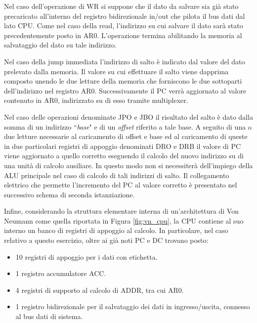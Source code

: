 Nel caso dell'operazione di WR si suppone che il dato da salvare sia già stato precaricato all'interno del registro bidirezionale in/out che pilota il bus dati dal lato CPU. Come nel caso della read, l'indirizzo su cui salvare il dato sarà stato precedentemente posto in AR0. L'operazione termina abilitando la memoria al salvataggio del dato su tale indirizzo.
\par \bigskip \noindent
Nel caso della jump immediata l'indirizzo di salto è indicato dal valore del dato prelevato dalla memoria. Il valore su cui effettuare il salto viene dapprima composto unendo le due letture della memoria che forniscono le due sottoparti dell'indirizzo nel registro AR0. Successivamente il PC verrà aggiornato al valore contenuto in AR0, indirizzato su di esso tramite multiplexer.
\par \bigskip \noindent
Nel caso delle operazioni denominate JPO e JBO il risultato del salto è dato dalla somma di un indirizzo \textquotedblleft \textit{base}" e di un \textit{offset} riferito a tale base. A seguito di una o due letture necessarie al caricamento di offset e base ed al caricamento di queste in due particolari registri di appoggio denominati DRO e DRB il valore di PC viene aggiornato a quello corretto eseguendo il calcolo del nuovo indirizzo su di una unità di calcolo ausiliare. In questo modo non si necessiterà dell'impiego della ALU principale nel caso di calcolo di tali indirizzi di salto. Il collegamento elettrico che permette l'incremento del PC al valore corretto è presentato nel successivo schema di seconda istanziazione.
\par \bigskip \noindent
Infine, considerando la struttura elementare interna di un'architettura di Von Neumann come quella riportata in Figura \ref{fig:vn_cpu}, la CPU contiene al suo interno un banco di registri di appoggio al calcolo. In particolare, nel caso relativo a questo esercizio, oltre ai già noti PC e DC trovano posto:
\begin{itemize}
	\item 10 registri di appoggio per i dati con etichetta.
	\item 1 registro accumulatore ACC.
	\item 4 registri di supporto al calcolo di ADDR, tra cui AR0.
	\item 1 registro bidirezionale per il salvataggio dei dati in ingresso/uscita, connesso al bus dati di sistema.
\end{itemize}
